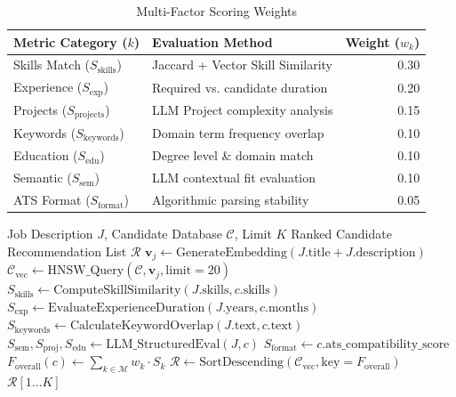 \documentclass[conference]{IEEEtran}
\begin{document}
\begin{table}[htbp]
\caption{Multi-Factor Scoring Weights}
\label{tab:weights}
\begin{center}
\begin{tabular}{llr}
\toprule
\textbf{Metric Category ($k$)} & \textbf{Evaluation Method} & \textbf{Weight ($w_k$)} \\
\midrule
Skills Match ($S_{\text{skills}}$) & Jaccard + Vector Skill Similarity & 0.30 \\
Experience ($S_{\text{exp}}$) & Required vs. candidate duration & 0.20 \\
Projects ($S_{\text{projects}}$) & LLM Project complexity analysis & 0.15 \\
Keywords ($S_{\text{keywords}}$) & Domain term frequency overlap & 0.10 \\
Education ($S_{\text{edu}}$) & Degree level \& domain match & 0.10 \\
Semantic ($S_{\text{sem}}$) & LLM contextual fit evaluation & 0.10 \\
ATS Format ($S_{\text{format}}$) & Algorithmic parsing stability & 0.05 \\
\bottomrule
\end{tabular}
\end{center}
\end{table}

\begin{algorithm}[htbp]
\caption{PrepGenius Hybrid Retrieval Algorithm}
\label{alg:hybrid}
\begin{algorithmic}[1]
\REQUIRE Job Description $J$, Candidate Database $\mathcal{C}$, Limit $K$
\ENSURE Ranked Candidate Recommendation List $\mathcal{R}$
\STATE $\mathbf{v}_j \leftarrow \text{GenerateEmbedding}(J.\text{title} + J.\text{description})$
\STATE $\mathcal{C}_{\text{vec}} \leftarrow \text{HNSW\_Query}(\mathcal{C}, \mathbf{v}_j, \text{limit}=20)$
    \STATE $S_{\text{skills}} \leftarrow \text{ComputeSkillSimilarity}(J.\text{skills}, c.\text{skills})$
    \STATE $S_{\text{exp}} \leftarrow \text{EvaluateExperienceDuration}(J.\text{years}, c.\text{months})$
    \STATE $S_{\text{keywords}} \leftarrow \text{CalculateKeywordOverlap}(J.\text{text}, c.\text{text})$
    \STATE $S_{\text{sem}}, S_{\text{proj}}, S_{\text{edu}} \leftarrow \text{LLM\_StructuredEval}(J, c)$
    \STATE $S_{\text{format}} \leftarrow c.\text{ats\_compatibility\_score}$
    \STATE $F_{\text{overall}}(c) \leftarrow \sum_{k \in \mathcal{M}} w_k \cdot S_k$
\ENDFOR
\STATE $\mathcal{R} \leftarrow \text{SortDescending}(\mathcal{C}_{\text{vec}}, \text{key}=F_{\text{overall}})$
\RETURN $\mathcal{R}[1 \dots K]$
\end{algorithmic}
\end{algorithm}
\end{document}
